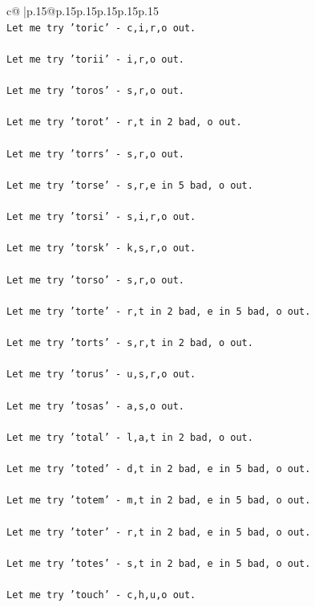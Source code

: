 \documentclass{article}
\begin{document}
{\begin{supertabular}{c@{$\;$}|p{.15\linewidth}@{}p{.15\linewidth}p{.15\linewidth}p{.15\linewidth}p{.15\linewidth}p{.15\linewidth}}
{{{\\ 
\texttt{Let me try 'toric' {-} c,i,r,o out. } \\
\\ 
\texttt{Let me try 'torii' {-} i,r,o out. } \\
\\ 
\texttt{Let me try 'toros' {-} s,r,o out. } \\
\\ 
\texttt{Let me try 'torot' {-} r,t in 2 bad, o out. } \\
\\ 
\texttt{Let me try 'torrs' {-} s,r,o out. } \\
\\ 
\texttt{Let me try 'torse' {-} s,r,e in 5 bad, o out. } \\
\\ 
\texttt{Let me try 'torsi' {-} s,i,r,o out. } \\
\\ 
\texttt{Let me try 'torsk' {-} k,s,r,o out. } \\
\\ 
\texttt{Let me try 'torso' {-} s,r,o out. } \\
\\ 
\texttt{Let me try 'torte' {-} r,t in 2 bad, e in 5 bad, o out. } \\
\\ 
\texttt{Let me try 'torts' {-} s,r,t in 2 bad, o out. } \\
\\ 
\texttt{Let me try 'torus' {-} u,s,r,o out. } \\
\\ 
\texttt{Let me try 'tosas' {-} a,s,o out. } \\
\\ 
\texttt{Let me try 'total' {-} l,a,t in 2 bad, o out. } \\
\\ 
\texttt{Let me try 'toted' {-} d,t in 2 bad, e in 5 bad, o out. } \\
\\ 
\texttt{Let me try 'totem' {-} m,t in 2 bad, e in 5 bad, o out. } \\
\\ 
\texttt{Let me try 'toter' {-} r,t in 2 bad, e in 5 bad, o out. } \\
\\ 
\texttt{Let me try 'totes' {-} s,t in 2 bad, e in 5 bad, o out. } \\
\\ 
\texttt{Let me try 'touch' {-} c,h,u,o out. } \\
}}}
\end{supertabular}}
\end{document}
